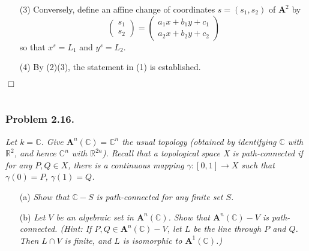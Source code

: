 \documentclass{article}
\begin{document}
\begin{enumerate}
\item[(3)]
  Conversely, define an affine change of coordinates $s = (s_1, s_2)$ of $\mathbf{A}^{2}$
  by
  \[
    \begin{pmatrix}
      s_1 \\
      s_2
    \end{pmatrix}
    = \begin{pmatrix}
      a_1 x + b_1 y + c_1 \\
      a_2 x + b_2 y + c_2
    \end{pmatrix}
  \]
  so that $x^{s} = L_1$ and $y^{s} = L_2$.

\item[(4)]
  By (2)(3), the statement in (1) is established.
\end{enumerate}
$\Box$ \\\\






\subsubsection*{Problem 2.16.}
\emph{Let $k = \mathbb{C}$. Give $\mathbf{A}^n(\mathbb{C}) = \mathbb{C}^n$ the usual topology
(obtained by identifying $\mathbb{C}$ with $\mathbb{R}^2$,
and hence $\mathbb{C}^n$ with $\mathbb{R}^{2n}$).
Recall that a topological space X is path-connected if
for any $P, Q \in X$, there is a continuous mapping $\gamma: [0, 1] \to X$
such that $\gamma(0) = P$, $\gamma(1) = Q$.}
\begin{enumerate}
\item[(a)]
  \emph{Show that $\mathbb{C} - S$ is path-connected for any finite set $S$.}

\item[(b)]
  \emph{Let $V$ be an algebraic set in $\mathbf{A}^n(\mathbb{C})$.
  Show that $\mathbf{A}^n(\mathbb{C}) - V$ is path-connected.
  (Hint: If $P, Q \in \mathbf{A}^n(\mathbb{C}) - V$, let $L$ be the line through $P$ and $Q$.
  Then $L \cap V$ is finite, and $L$ is isomorphic to $\mathbf{A}^1(\mathbb{C})$.)} \\
\end{enumerate}
\end{document}
